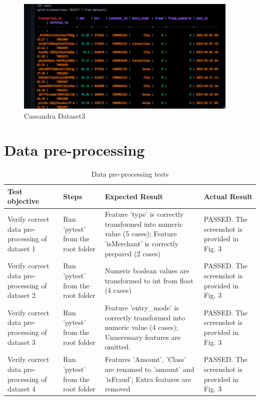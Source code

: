 \documentclass[12pt,a4paper, hidelinks]{article}
\begin{document}
\begin{figure}[htbp]
  \centering
  \includegraphics[width=0.95\textwidth]{images/m2-dataset-3.png}
  \caption{Cassandra Dataset3}
  \label{fig:cassandra3}
\end{figure}

\section{Data pre-processing}

\begin{table}[htbp]
\centering
\begin{tabular}{|p{3cm}|p{2cm}|p{4cm}|p{5cm}|}
\hline
\textbf{Test objective} & \textbf{Steps} & \textbf{Expected Result} & \textbf{Actual Result} \\
\hline
Verify correct data pre-processing of dataset 1 & Run 'pytest' from the root folder & Feature 'type' is correctly transformed into numeric value (5 cases); Feature 'isMerchant' is correctly prepared (2 cases) & PASSED. The screenshot is provided in Fig. 3 \\
\hline
Verify correct data pre-processing of dataset 2 & Run 'pytest' from the root folder & Numeric boolean values are transformed to int from float (4 cases) & PASSED. The screenshot is provided in Fig. 3 \\
\hline
Verify correct data pre-processing of dataset 3 & Run 'pytest' from the root folder & Feature 'entry\_mode' is correctly transformed into numeric value (4 cases); Unnecessary features are omitted. & PASSED. The screenshot is provided in Fig. 3 \\
\hline
Verify correct data pre-processing of dataset 4 & Run 'pytest' from the root folder & Features 'Amount', 'Class' are renamed to 'amount' and 'isFraud'; Extra features are removed & PASSED. The screenshot is provided in Fig. 3 \\
\hline
\end{tabular}
\caption{Data pre-processing tests}
\end{table}
\end{document}
